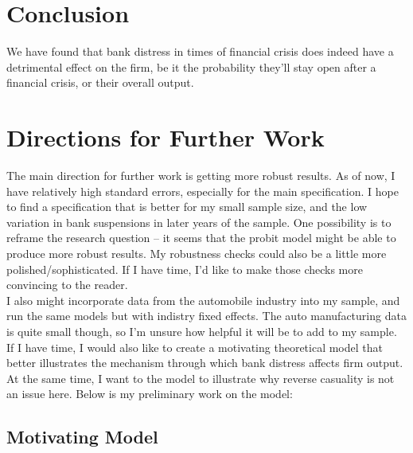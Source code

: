 \documentclass[letter,11pt]{article}
\begin{document}
{\section{Conclusion}
We have found that bank distress in times of financial crisis does indeed have a detrimental effect on the firm, be it the probability they'll stay open after a financial crisis, or their overall output. 

\section{Directions for Further Work}

\indent The main direction for further work is getting more robust results. As of now, I have relatively high standard errors, especially for the main specification. I hope to find a specification that is better for my small sample size, and the low variation in bank suspensions in later years of the sample. One possibility is to reframe the research question -- it seems that the probit model might be able to produce more robust results. My robustness checks could also be a little more polished/sophisticated. If I have time, I'd like to make those checks more convincing to the reader.
\\
\indent I also might incorporate data from the automobile industry into my sample, and run the same models but with indistry fixed effects. The auto manufacturing data is quite small though, so I'm unsure how helpful it will be to add to my sample. 
\\
\indent If I have time, I would also like to create a motivating theoretical model that better illustrates the mechanism through which bank distress affects firm output. At the same time, I want to the model to illustrate why reverse casuality is not an issue here. Below is my preliminary work on the model:

\subsection{Motivating Model}

}
\end{document}
